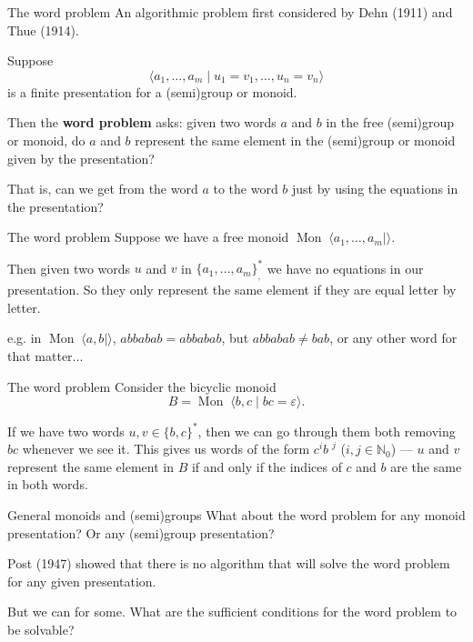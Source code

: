 \documentclass{beamer}
\let\epsilon\varepsilon
\newcommand{\Mon}{\operatorname{Mon}\;}
\newcommand{\pskip}{\medskip}
\begin{document}
\begin{frame}{The word problem}
	An algorithmic problem first considered by Dehn (1911) and Thue (1914).\pskip

	Suppose
		\[ \langle a_1, \ldots, a_m \mid u_1 = v_1, \ldots, u_n = v_n \rangle \]
	is a finite presentation for a (semi)group or monoid.\medskip
	
	Then the \textbf{word problem} asks: given two words $a$ and $b$ in the free (semi)group or monoid, do $a$ and $b$ represent the same element in the (semi)group or monoid given by the presentation?\pskip

	That is, can we get from the word $a$ to the word $b$ just by using the equations in the presentation?
\end{frame}

\begin{frame}{The word problem}
	Suppose we have a free monoid $\Mon \langle a_1, \ldots, a_m \mid\rangle$.\pskip

	Then given two words $u$ and $v$ in $\{a_1, \ldots, a_m\}^*_,$ we have no equations in our presentation. So they only represent the same element if they are equal letter by letter.\pskip

	e.g. in $\Mon\langle a, b \mid\rangle$, $abbabab = abbabab$, but $abbabab \ne bab$, or any other word for that matter...
\end{frame}

\begin{frame}{The word problem}
	Consider the bicyclic monoid \[ B = \Mon \langle b, c \mid bc = \epsilon \rangle. \]

	If we have two words $u, v \in \{b, c\}^*$, then we can go through them both removing $bc$ whenever we see it. This gives us words of the form $c^i {b\;}^j$ ($i, j \in \mathbb{N}_0$) --- $u$ and $v$ represent the same element in $B$ if and only if the indices of $c$ and $b$ are the same in both words.

\end{frame}

\begin{frame}{General monoids and (semi)groups}
	What about the word problem for any monoid presentation? Or any (semi)group presentation?\pskip

	\pause
	Post (1947) showed that there is no algorithm that will solve the word problem for any given presentation.\pskip

	But we can for some. What are the sufficient conditions for the word problem to be solvable?
\end{frame}
\end{document}
